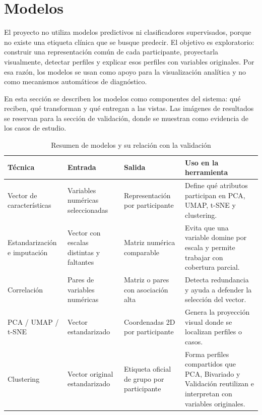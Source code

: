 \documentclass[12pt,a4paper]{article}
\begin{document}
\section{Modelos}

El proyecto no utiliza modelos predictivos ni clasificadores supervisados, porque no existe una etiqueta cl\'inica que se busque predecir. El objetivo es exploratorio: construir una representaci\'on com\'un de cada participante, proyectarla visualmente, detectar perfiles y explicar esos perfiles con variables originales. Por esa raz\'on, los modelos se usan como apoyo para la visualizaci\'on anal\'itica y no como mecanismos autom\'aticos de diagn\'ostico.

En esta secci\'on se describen los modelos como componentes del sistema: qu\'e reciben, qu\'e transforman y qu\'e entregan a las vistas. Las im\'agenes de resultados se reservan para la secci\'on de validaci\'on, donde se muestran como evidencia de los casos de estudio.

\begin{table}[H]
\centering
\caption{Resumen de modelos y su relaci\'on con la validaci\'on}
\begin{tabularx}{\textwidth}{p{3cm} p{3.2cm} p{3.4cm} X}
\toprule
\textbf{T\'ecnica} & \textbf{Entrada} & \textbf{Salida} & \textbf{Uso en la herramienta} \\
\midrule
Vector de caracter\'isticas & Variables num\'ericas seleccionadas & Representaci\'on por participante & Define qu\'e atributos participan en PCA, UMAP, t-SNE y clustering. \\
Estandarizaci\'on e imputaci\'on & Vector con escalas distintas y faltantes & Matriz num\'erica comparable & Evita que una variable domine por escala y permite trabajar con cobertura parcial. \\
Correlaci\'on & Pares de variables num\'ericas & Matriz o pares con asociaci\'on alta & Detecta redundancia y ayuda a defender la selecci\'on del vector. \\
PCA / UMAP / t-SNE & Vector estandarizado & Coordenadas 2D por participante & Genera la proyecci\'on visual donde se localizan perfiles o casos. \\
Clustering & Vector original estandarizado & Etiqueta oficial de grupo por participante & Forma perfiles compartidos que PCA, Bivariado y Validaci\'on reutilizan e interpretan con variables originales. \\
\bottomrule
\end{tabularx}
\end{table}
\end{document}
